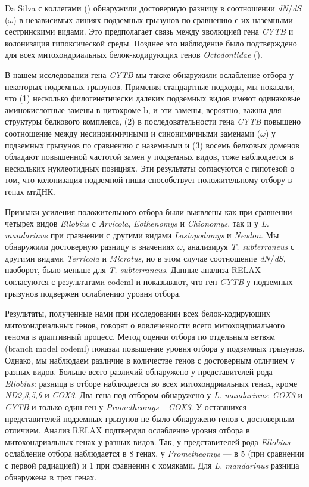 Da Silva с коллегами (\cite{DaSilva2009}) обнаружили достоверную разницу в соотношении \textit{dN}/\textit{dS} ($\omega$) в независимых линиях подземных грызунов по сравнению с их наземными сестринскими видами. Это предполагает связь между эволюцией гена \textit{CYTB} и колонизация гипоксической среды. Позднее это наблюдение было подтверждено для всех митохондриальных белок-кодирующих генов \textit{Octodontidae} (\cite{Tomasco2011}).

В нашем исследовании гена \textit{CYTB} мы также обнаружили ослабление отбора у некоторых подземных грызунов. Применяя стандартные подходы, мы показали, что (1) несколько филогенетически далеких подземных видов имеют одинаковые аминокислотные замены в цитохроме b, и эти замены, вероятно, важны для структуры белкового комплекса, (2) в последовательности гена \textit{CYTB} повышено соотношение между несинонимичными и синонимичными заменами ($\omega$) у подземных грызунов по сравнению с наземными и (3) восемь белковых доменов обладают повышенной частотой замен у подземных видов, тоже наблюдается в нескольких нуклеотидных позициях. Эти результаты согласуются с гипотезой о том, что колонизация подземной ниши способствует положительному отбору в генах мтДНК.

Признаки усиления положительного отбора были выявлены как при сравнении четырех видов \textit{Ellobius} с \textit{Arvicola}, \textit{Eothenomys} и \textit{Chionomys}, так и у \textit{L. mandarinus} при сравнении с другими видами \textit{Lasiopodomys} и \textit{Neodon}. Мы обнаружили достоверную разницу в значениях $\omega$, анализируя \textit{T. subterraneus} с другими видами \textit{Terricola} и \textit{Microtus}, но в этом случае соотношение \textit{dN}/\textit{dS}, наоборот, было меньше для \textit{T. subterraneus}. Данные анализа RELAX согласуются с результатами codeml и показывают, что ген \textit{CYTB} у подземных грызунов подвержен ослаблению уровня отбора.


Результаты, полученные нами при исследовании всех белок-кодирующих митохондриальных генов, говорят о вовлеченности всего митохондриального генома в адаптивный процесс. Метод оценки отбора по отдельным ветвям (branch model codeml) показал повышение уровня отбора у подземных грызунов. Однако, мы наблюдаем различие в количестве генов с достоверным отличием у разных видов. Больше всего различий обнаружено у представителей рода \textit{Ellobius}: разница в отборе наблюдается во всех митохондриальных генах, кроме \textit{ND2,3,5,6} и \textit{COX3}. Два гена под отбором обнаружено у \textit{L. mandarinus}: \textit{COX3} и \textit{CYTB} и только один ген у \textit{Prometheomys} -- \textit{COX3}. У оставшихся представителей подземных грызунов не было обнаружено генов с достоверным отличием. Анализ RELAX подтвердил ослабление уровня отбора в митохондриальных генах у разных видов. Так, у представителей рода \textit{Ellobius} ослабление отбора наблюдается в 8 генах, у \textit{Prometheomys} --- в 5 (при сравнении с первой радиацией) и 1 при сравнении с хомяками. Для \textit{L. mandarinus} разница обнаружена в трех генах.  

